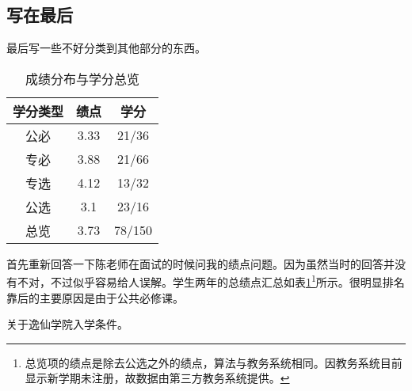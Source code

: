 \documentclass[10pt,a4paper]{article}
\begin{document}
\begin{spacing}{1.6}
\section{写在最后}
最后写一些不好分类到其他部分的东西。\par
\begin{table}[h!]
\centering
\caption{成绩分布与学分总览}
\begin{tabular}{c c c}
\hline
学分类型 & 绩点 & 学分\\ [.2ex]
\hline \hline
公必 & 3.33	&21/36  \\
专必 & 3.88	&21/66 \\
专选 & 4.12 &13/32 \\
公选 & 3.1	&23/16 \\
总览 & 3.73	&78/150 \\ [.2ex]
\hline
\end{tabular}
\label{t:gr}
\end{table}
首先重新回答一下陈老师在面试的时候问我的绩点问题。因为虽然当时的回答并没有不对，不过似乎容易给人误解。学生两年的总绩点汇总如表\ref{t:gr}\footnote{总览项的绩点是除去公选之外的绩点，算法与教务系统相同。因教务系统目前显示新学期未注册，故数据由第三方教务系统提供。}所示。很明显排名靠后的主要原因是由于公共必修课。\par
关于逸仙学院入学条件。

\end{spacing}

\medskip
\renewcommand\refname{提到的书籍}


\end{document}
